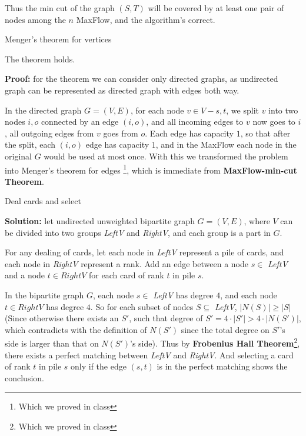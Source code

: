 \documentclass{article}
\begin{document}
\begin{description}
  Thus the min cut of the graph $(S, T)$ will be covered by at least one pair of nodes among the $n$ MaxFlow, and the algorithm's correct.

\item[2]{Menger's theorem for vertices}
  
  The theorem holds.

  \textbf{Proof:} for the theorem we can consider only directed graphs, as undirected graph can be represented as directed graph with edges both way.

  In the directed graph $G = (V, E)$, for each node $v \in V - {s, t}$, we split $v$ into two nodes $i, o$ connected by an edge $(i, o)$, and all incoming edges to $v$ now goes to $i$, all outgoing edges from $v$ goes from $o$. Each edge has capacity $1$, so that after the split, each $(i, o)$ edge has capacity $1$, and in the MaxFlow each node in the original $G$ would be used at most once. With this we transformed the problem into Menger's theorem for edges \footnote{Which we proved in class}, which is immediate from \textbf{MaxFlow-min-cut Theorem}.


\item[3]{Deal cards and select}

  \textbf{Solution:} let undirected unweighted bipartite graph $G = (V, E)$, where $V$ can be divided into two groups \textit{LeftV} and \textit{RightV}, and each group is a part in $G$. 

  For any dealing of cards, let each node in \textit{LeftV} represent a pile of cards, and each node in \textit{RightV} represent a rank. Add an edge between a node $s \in$ \textit{LeftV} and a node $t \in RightV$ for each card of rank $t$ in pile $s$.

  In the bipartite graph $G$, each node $s \in$ \textit{LeftV} has degree $4$, and each node $t \in RightV$ has degree $4$. So for each subset of nodes $S \subseteq$ \textit{LeftV}, $|N(S)| \geq |S|$ (Since otherwise there exists an $S'$, such that degree of $S' = 4 \cdot |S'| > 4 \cdot |N(S')|$, which contradicts with the definition of $N(S')$ since the total degree on $S'$'s side is larger than that on $N(S')$'s side). Thus by \textbf{Frobenius Hall Theorem}\footnote{Which we proved in class}, there exists a perfect matching between \textit{LeftV} and \textit{RightV}. And selecting a card of rank $t$ in pile $s$ only if the edge $(s,t)$ is in the perfect matching shows the conclusion.


\end{description}
\end{document}
